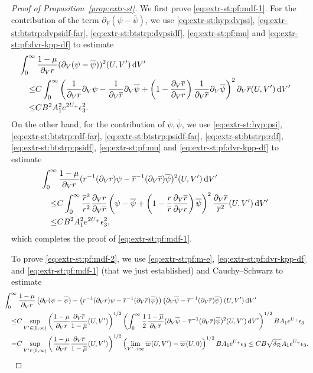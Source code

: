 \documentclass[10pt, reqno]{amsart}
\theoremstyle{definition}
\theoremstyle{remark}
\theoremstyle{conjecture}
\numberwithin{equation}{section}
\newcommand{\ud}{\mathrm{d}}
\newcommand{\rd}{\partial}
\newcommand{\0}{\emptyset}
\newcommand{\dlt}{\delta}
\newcommand{\eps}{\epsilon}
\newcommand{\calR}{\mathcal R}
\newcommand{\psibg}{\overline{\psi}}				%
\newcommand{\rbg}{\overline{r}}					%
\newcommand{\mubg}{\overline{\mu}}				%
\begin{document}
\begin{proof}[Proof of Proposition~\ref{prop:extr-st}]
We first prove \eqref{eq:extr-st:pf:mdf-1}. For the contribution of the term $\rd_{V} (\psi - \psibg)$, we use \eqref{eq:extr-st:hyp:dvpsi}, \eqref{eq:extr-st:btstrp:dvpsidf-far}, \eqref{eq:extr-st:btstrp:dvpsidf}, \eqref{eq:extr-st:pf:mu} and \eqref{eq:extr-st:pf:dvr-kpp-df} to estimate
\begin{align*}
& \hskip-2em
\int_{0}^{\infty} \frac{1-\mu}{\rd_{V} r}(\rd_{V} (\psi - \psibg))^{2} (U, V') \, \ud V' \\
\leq  & C \int_{0}^{\infty} \left( \frac{1}{\rd_{V} r} \rd_{V} \psi - \frac{1}{\rd_{V} \rbg} \rd_{V} \psibg + \left( 1 - \frac{\rd_{V} \rbg}{\rd_{V} r} \right) \frac{1}{\rd_{V} \rbg} \rd_{V} \psibg \right)^{2} \rd_{V} \rbg (U, V') \, \ud V' \\
\leq & C B^{2} A_{1}^{2} e^{2 U_{+}} \eps_{3}^{2}.
\end{align*}
On the other hand, for the contribution of $\psi, \psibg$, we use \eqref{eq:extr-st:hyp:psi}, \eqref{eq:extr-st:btstrp:rdf-far}, \eqref{eq:extr-st:btstrp:psidf-far}, \eqref{eq:extr-st:btstrp:rdf}, \eqref{eq:extr-st:btstrp:psidf}, \eqref{eq:extr-st:pf:mu} and \eqref{eq:extr-st:pf:dvr-kpp-df} to estimate
\begin{align*}
& \hskip-2em
\int_{0}^{\infty} \frac{1-\mu}{\rd_{V} r}(r^{-1} ( \rd_{V} r ) \psi - \rbg^{-1} ( \rd_{V} \rbg ) \psibg)^{2} (U, V') \, \ud V' \\
\leq & C \int_{0}^{\infty} \frac{\rbg^{2}}{r^{2}} \frac{\rd_{V} r}{\rd_{V} \rbg} \left(  \psi - \psibg + \left(1 - \frac{r}{\rbg} \frac{\rd_{V} \rbg}{\rd_{V} r}\right) \psibg \right)^{2} \frac{\rd_{V} \rbg}{\rbg^{2}}(U, V') \, \ud V' \\
\leq & C B^{2} A_{1}^{2} e^{2 U_{+}} \eps_{3}^{2},
\end{align*}
which completes the proof of \eqref{eq:extr-st:pf:mdf-1}.

To prove \eqref{eq:extr-st:pf:mdf-2}, we use \eqref{eq:extr-st:pf:m-e}, \eqref{eq:extr-st:pf:dvr-kpp-df} and \eqref{eq:extr-st:pf:mdf-1} (that we just established) and Cauchy--Schwarz to estimate
\begin{align*}
& \hskip-2em
\int_{0}^{\infty} \frac{1-\mu}{\rd_{V} r} \left(\rd_{V} (\psi - \psibg) - \left(r^{-1} ( \rd_{V} r ) \psi - \rbg^{-1} ( \rd_{V} \rbg ) \psibg\right)\right) \left(\rd_{V} \psibg - \rbg^{-1} ( \rd_{V} \rbg ) \psibg\right) (U, V') \, \ud V' \\ 
\leq & C \sup_{V' \in [0, \infty)} \left( \frac{1-\mu}{\rd_{V} r} \frac{\rd_{V} \rbg}{1-\mubg} (U, V') \right)^{1/2} \left( \int_{0}^{\infty} \frac{1}{2}\frac{1-\mubg}{\rd_{V} \rbg} (\rd_{V} \psibg - \rbg^{-1} ( \rd_{V} \rbg ) \psibg)^{2} (U, V') \, \ud V' \right)^{1/2} B A_{1} e^{U_{+}}  \eps_{3} \\
=& C \sup_{V' \in [0, \infty)} \left( \frac{1-\mu}{\rd_{V} r} \frac{\rd_{V} \rbg}{1-\mubg} (U, V') \right)^{1/2} \left( \lim_{V'\to \infty} \overline{\varpi}(U,V')-\overline{\varpi}(U,0) \right)^{1/2} B A_{1} e^{U_{+}}  \eps_{3} \leq  C B \sqrt{\dlt_{\calR}} A_{1} e^{U_{+}} \eps_{3}.
\end{align*}


\end{proof}
\end{document}
